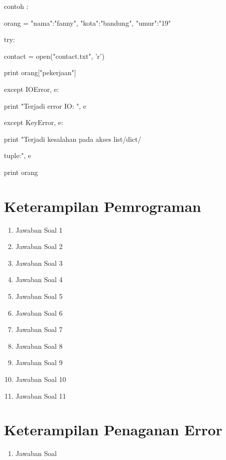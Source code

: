 contoh :

orang = {"nama":"fanny", "kota":"bandung", "umur":"19"}

try:

    contact = open("contact.txt", 'r')
    
    print orang["pekerjaan"]
    
except IOError, e:

    print "Terjadi error IO: ", e
    
except KeyError, e:

    print "Terjadi kesalahan pada akses list/dict/
    
    tuple:", e

print orang


\section{Keterampilan Pemrograman}
\begin{enumerate}

\item Jawaban Soal 1


\item Jawaban Soal 2


\item Jawaban Soal 3


\item Jawaban Soal 4


\item Jawaban Soal 5


\item Jawaban Soal 6


\item Jawaban Soal 7


\item Jawaban Soal 8


\item Jawaban Soal 9

\item Jawaban Soal 10


\item Jawaban Soal 11

\end{enumerate}

\section{Keterampilan Penaganan Error}
\begin{enumerate}
\item Jawaban Soal 


\end{enumerate}

